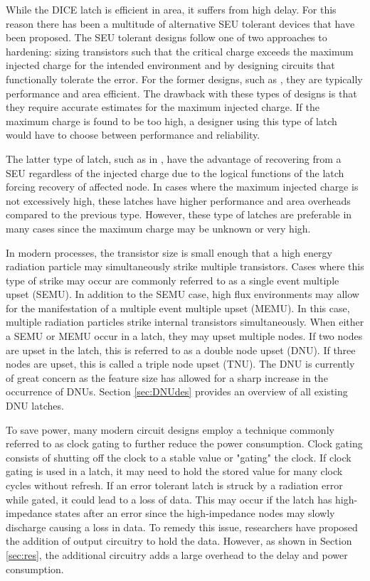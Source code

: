 While the DICE latch is efficient in area, it suffers from high delay. For this reason there has been a multitude of alternative SEU tolerant devices that have been proposed. The SEU tolerant designs follow one of two approaches to hardening: sizing transistors such that the critical charge exceeds the maximum injected charge for the intended environment and by designing circuits that functionally tolerate the error. For the former designs, such as \cite{NicoFeedback}, they are typically performance and area efficient. The drawback with these types of designs is that they require accurate estimates for the maximum injected charge. If the maximum charge is found to be too high, a designer using this type of latch would have to choose between performance and reliability. 

The latter type of latch, such as in \cite{HIPER, FERST, Hazucha, SEMULatch, Multivdd, BISER}, have the advantage of recovering from a SEU regardless of the injected charge due to the logical functions of the latch forcing recovery of affected node. In cases where the maximum injected charge is not excessively high, these latches have higher performance and area overheads compared to the previous type. However, these type of latches are preferable in many cases since the maximum charge may be unknown or very high. 

In modern processes, the transistor size is small enough that a high energy radiation particle may simultaneously strike multiple transistors. Cases where this type of strike may occur are commonly referred to as a single event multiple upset (SEMU). In addition to the SEMU case, high flux environments may allow for the manifestation of a multiple event multiple upset (MEMU). In this case, multiple radiation particles strike internal transistors simultaneously. When either a SEMU or MEMU occur in a latch, they may upset multiple nodes. If two nodes are upset in the latch, this is referred to as a double node upset (DNU). If three nodes are upset, this is called a triple node upset (TNU). The DNU is currently of great concern as the feature size has allowed for a sharp increase in the occurrence of DNUs. Section \ref{sec:DNUdes} provides an overview of all existing DNU latches.     

To save power, many modern circuit designs employ a technique commonly referred to as clock gating to further reduce the power consumption. Clock gating consists of shutting off the clock to a stable value or "gating" the clock. If clock gating is used in a latch, it may need to hold the stored value for many clock cycles without refresh. If an error tolerant latch is struck by a radiation error while gated, it could lead to a loss of data. This may occur if the latch has high-impedance states after an error since the high-impedance nodes may slowly discharge causing a loss in data. To remedy this issue, researchers have proposed the addition of output circuitry to hold the data. However, as shown in Section \ref{sec:res}, the additional circuitry adds a large overhead to the delay and power consumption.

